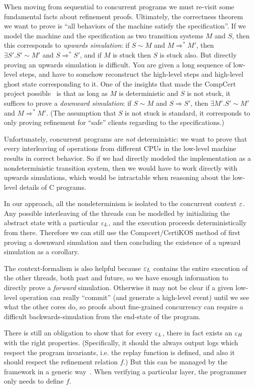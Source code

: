 When moving from sequential to concurrent programs we must
re-visit some fundamental facts about refinement proofs.  Ultimately,
the correctness theorem we want to prove is ``all behaviors of the
machine satisfy the specification''. If we model the machine and the
specification as two transition systems $M$ and $S$, then this
corresponds to \emph{upwards simulation}: if $S \sim M$ and $M
\Longrightarrow^* M'$, then $\exists S'. S' \sim M'$ and $S
\Longrightarrow^* S'$, and if $M$ is stuck then $S$ is stuck also.
But directly proving an upwards simulation is difficult. You are given
a long sequence of low-level steps, and have to somehow reconstruct
the high-level steps and high-level ghost state corresponding to
it. One of the insights that made the CompCert project
possible~\cite{Leroy-backend} is that as long as $M$ is deterministic
and $S$ is not stuck, it suffices to prove a \emph{downward
  simulation}: if $S \sim M$ and $S \Longrightarrow S'$, then $\exists
M'. S' \sim M'$ and $M \Longrightarrow^* M'$. (The assumption that $S$
is not stuck is standard, it corresponds to only proving refinement
for ``safe'' clients regarding to the specifications.)

Unfortunately, concurrent programs are \emph{not} deterministic: we
want to prove that every interleaving of operations from
different CPUs in the low-level machine results in correct
behavior. So if we had directly modeled the implementation as a
nondeterministic transition system, then we would have to work
directly with upwards simulations, which would be intractable when
reasoning about the low-level details of C programs.

In our approach, all the nondeterminism is isolated to the concurrent
context $\oracle$. Any possible interleaving of the threads can be
modelled by initializing the abstract state with a particular
$\oracle_L$, and the execution proceeds deterministically from
there. Therefore we can still use the Compcert/CertiKOS method of first
proving a downward simulation and then concluding the existence of a
upward simulation as a corollary.

The context-formalism is also helpful because $\oracle_L$ contains
the entire execution of the other threads, both past and future, so we
have enough information to directly prove a \emph{forward}
simulation. Otherwise it may not be clear if a given low-level
operation can really ``commit'' (and generate a high-level event)
until we see what the other cores do, so proofs about fine-grained
concurrency can require a difficult backwards-simulation
from the end-state of the program.~\cite{doherty:lock-free}

There is still an obligation to show that for every $\oracle_L$, there
in fact exists an $\oracle_H$ with the right
properties. (Specifically, it should the always output logs which
respect the program invariants, i.e. the replay function is defined,
and also it should respect the refinement relation $f$.) But this can
be managed by the framework in a generic way~\cite{ccal16}. When
verifying a particular layer, the programmer only needs to define $f$.

